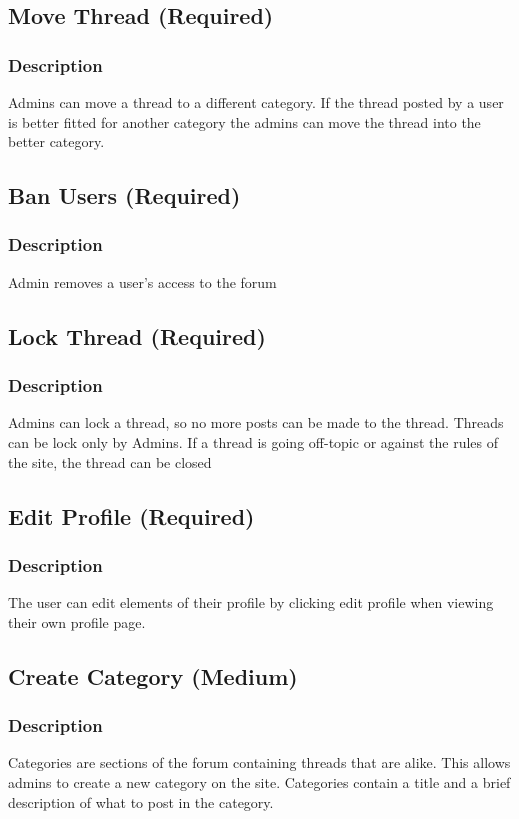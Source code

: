 \documentclass[12pt]{scrartcl}
\begin{document}
\subsection{Move Thread (Required)}
\subsubsection{Description}
Admins can move a thread to a different category.
If the thread posted by a user is better fitted for another category the admins can move the thread into the better category. 

\subsection{Ban Users (Required)}
\subsubsection{Description}
 
Admin removes a user’s access to the forum

\subsection{Lock Thread (Required)}
\subsubsection{Description}
Admins can lock a thread, so no more posts can be made to the thread. Threads can be lock only by Admins.
If a thread is going off-topic or against the rules of the site, the thread can be closed 


\subsection{Edit Profile (Required)}
\subsubsection{Description}
The user can edit elements of their profile by clicking edit profile when viewing their own profile page.

\subsection{Create Category (Medium)}
\subsubsection{Description}
Categories are sections of the forum containing threads that are alike.
This allows admins to create a new category on the site. Categories contain a title and a brief description of what to post in the category.
\end{document}
